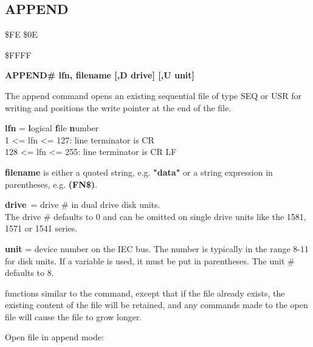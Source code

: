\subsection{APPEND}
\begin{description}[leftmargin=3cm,style=nextline]
\item [Token:] \$FE \$0E
\item [Address:] \$FFFF
\item [Format:]
  {\bf APPEND\# lfn, filename [,D drive] [,U unit] }
\item [Usage:]
   The append command opens an existing sequential file of type
   SEQ or USR for writing and positions the write pointer
   at the end of the file.

   {\bf lfn} = {\bf l}ogical {\bf f}ile {\bf n}umber \\
   1 <= lfn <= 127: line terminator is CR \\
   128 <= lfn <= 255: line terminator is CR LF

   {\bf filename} is either a quoted string, e.g. {\bf "data"} or
   a string expression in parentheses, e.g. {\bf (FN\$)}.

   {\bf drive} = drive \# in dual drive disk units. \\
   The drive \# defaults to 0 and can be omitted on single drive units
   like the 1581, 1571 or 1541 series.

   {\bf unit} = device number on the IEC bus.
   The number is typically in the range 8-11 for disk units.
   If a variable is used, it must be put in parentheses.
   The unit \# defaults to 8.

\item [Remarks:]
    functions similar to the 
   command, except that if the file already
   exists, the existing content of the file will be retained, and any
    commands made to the
   open file will cause the file to grow longer.

\item [Example:] Open file in append mode: \\

\end{description}


\newpage
